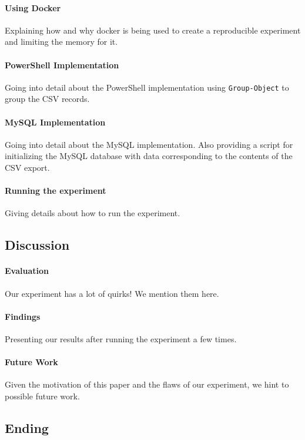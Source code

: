 \documentclass[12pt,letterpaper]{article} %
\begin{document}
\paragraph{Using Docker}
Explaining how and why docker is being used to create a reproducible experiment
and limiting the memory for it.

\paragraph{PowerShell Implementation}
Going into detail about the PowerShell implementation using \verb+Group-Object+
to group the CSV records.

\paragraph{MySQL Implementation}
Going into detail about the MySQL implementation. Also providing a script for initializing
the MySQL database with data corresponding to the contents of the CSV export.

\paragraph{Running the experiment}
Giving details about how to run the experiment.

\subsection{Discussion}

\paragraph{Evaluation}
Our experiment has a lot of quirks! We mention them here.

\paragraph{Findings}
Presenting our results after running the experiment a few times.

\paragraph{Future Work}
Given the motivation of this paper and the flaws of our experiment,
we hint to possible future work.

\subsection{Ending}
\end{document}
